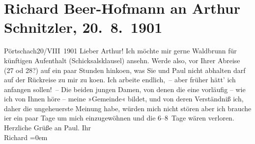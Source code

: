 

         
         \renewcommand{\erwaehntePersonen}{Personen: Paul Goldmann, Olga Schnitzler, Elisabeth Steinrück}
         \renewcommand{\erwaehnteOrte}{Orte: Pörtschach, Welsberg-Taisten, Wildbad Waldbrunn}
         \renewcommand{\erwaehnteWerke}{}
               \section[Richard Beer-Hofmann an Arthur Schnitzler, 20. 8. 1901]{ Richard Beer-Hofmann an Arthur Schnitzler, 20. 8. 1901}\nopagebreak{}\rehead{ }\begin{ledgroupsized}[t]{13cm}\normalsize\beginnumbering \toendnotes[C]{\smallbreak\pagebreak[2]} 
\toendnotes[C]{\smallbreak}\pstart
           \raggedleft{}{\pb}Pörtschach20/VIII 1901\pend
           \pstart
           Lieber Arthur! Ich möchte mir gerne Waldbrunn für künftigen Aufenthalt (Schicksalsklausel) ansehn. Werde also,
               vor Ihrer Abreise (27 od 28?) auf ein paar Stunden hinko{\geminationm}en, was Sie und Paul nicht abhalten darf auf der Rückreise zu mir zu ko{\geminationm}en. Ich arbeite endlich, – aber früher hätt’ ich
               anfangen sollen! –\pend
           \pstart
           {\pb}Die beiden jungen Damen, von denen die
                  eine vorläufig – wie ich
               von Ihnen höre – meine »Gemeinde« bildet, und von deren Verständniß ich, daher die
               ungeheuerste Meinung habe, würden mich nicht stören aber ich brauche i{\geminationm}er ein paar Tage um mich einzugewöhnen und die 6–8 Tage
               wären verloren.\pend
           \pstart
           Herzliche Grüße an Paul.\pend
           \pstart
           Ihr{\\[\baselineskip]}\spacefill\mbox{Richard}\pend
           \leftskip=0em{}
         
         \endnumbering{}\end{ledgroupsized}  \newcommand{\dateiname}{L01164}\newcommand{\titel}{Richard Beer-Hofmann an Arthur Schnitzler, 20. 8. 1901}\newcommand{\editorInnen}{Martin Anton Müller und Gerd-Hermann Susen}
      